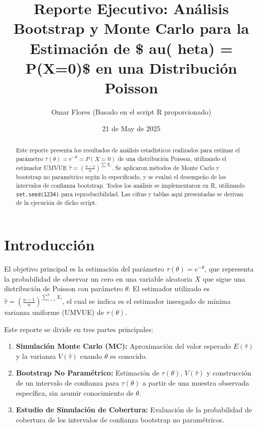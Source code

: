 \documentclass[
  11pt,
  a4paper]{article}
\title{Reporte Ejecutivo: Análisis Bootstrap y Monte Carlo para la
Estimación de \$ au( heta) = P(X=0)\$ en una Distribución Poisson}
\author{Omar Flores (Basado en el script R proporcionado)}
\date{21 de May de 2025}
\begin{document}
\maketitle
\begin{abstract}
Este reporte presenta los resultados de análisis estadísticos realizados
para estimar el parámetro \(\tau(\theta) = e^{-\theta} = P(X=0)\) de una
distribución Poisson, utilizando el estimador UMVUE
\(\hat{\tau} = \left(\frac{n-1}{n}\right)^{\sum X_i}\). Se aplicaron
métodos de Monte Carlo y bootstrap no paramétrico según lo especificado,
y se evaluó el desempeño de los intervalos de confianza bootstrap. Todos
los análisis se implementaron en R, utilizando \texttt{set.seed(1234)}
para reproducibilidad. Las cifras y tablas aquí presentadas se derivan
de la ejecución de dicho script.
\end{abstract}

\hrulefill

\hrulefill
\vspace{1em}

\section{Introducción}

El objetivo principal es la estimación del parámetro
\(\tau(\theta) = e^{-\theta}\), que representa la probabilidad de
observar un cero en una variable aleatoria \(X\) que sigue una
distribución de Poisson con parámetro \(\theta\). El estimador utilizado
es \(\hat{\tau} = \left(\frac{n-1}{n}\right)^{\sum_{i=1}^n X_i}\), el
cual se indica es el estimador insesgado de mínima varianza uniforme
(UMVUE) de \(\tau(\theta)\).

Este reporte se divide en tres partes principales:

\begin{enumerate}
    \item \textbf{Simulación Monte Carlo (MC):} Aproximación del valor esperado $E(\hat{\tau})$ y la varianza $V(\hat{\tau})$ cuando $\theta$ es conocido.
    \item \textbf{Bootstrap No Paramétrico:} Estimación de $\tau(\theta)$, $V(\hat{\tau})$ y construcción de un intervalo de confianza para $\tau(\theta)$ a partir de una muestra observada específica, sin asumir conocimiento de $\theta$.
    \item \textbf{Estudio de Simulación de Cobertura:} Evaluación de la probabilidad de cobertura de los intervalos de confianza bootstrap no paramétricos.
\end{enumerate}
\end{document}
